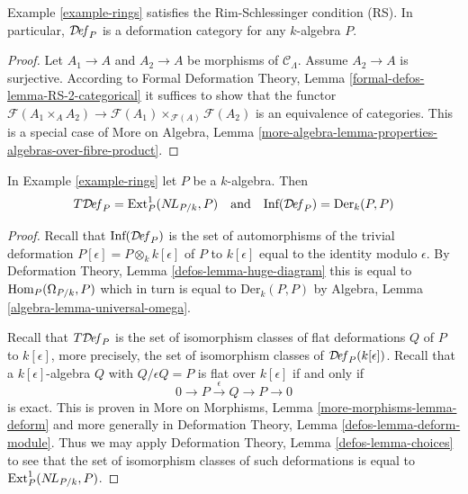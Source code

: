 \begin{lemma}
\label{lemma-rings-RS}
Example \ref{example-rings}
satisfies the Rim-Schlessinger condition (RS).
In particular, $\mathcal{D}\!\mathit{ef}_P$ is a deformation category
for any $k$-algebra $P$.
\end{lemma}

\begin{proof}
Let $A_1 \to A$ and $A_2 \to A$ be morphisms of $\mathcal{C}_\Lambda$.
Assume $A_2 \to A$ is surjective. According to
Formal Deformation Theory, Lemma
\ref{formal-defos-lemma-RS-2-categorical}
it suffices to show that the functor
$\mathcal{F}(A_1 \times_A A_2) \to
\mathcal{F}(A_1) \times_{\mathcal{F}(A)} \mathcal{F}(A_2)$
is an equivalence of categories.
This is a special case of More on Algebra, Lemma
\ref{more-algebra-lemma-properties-algebras-over-fibre-product}.
\end{proof}

\begin{lemma}
\label{lemma-rings-TI}
In Example \ref{example-rings} let $P$ be a $k$-algebra. Then
$$
T\mathcal{D}\!\mathit{ef}_P = \text{Ext}^1_P(\mathop{N\!L}\nolimits_{P/k}, P)
\quad\text{and}\quad
\text{Inf}(\mathcal{D}\!\mathit{ef}_P) = \text{Der}_k(P, P)
$$
\end{lemma}

\begin{proof}
Recall that $\text{Inf}(\mathcal{D}\!\mathit{ef}_P)$ is the set of
automorphisms of the trivial deformation
$P[\epsilon] = P \otimes_k k[\epsilon]$ of $P$ to $k[\epsilon]$
equal to the identity modulo $\epsilon$.
By Deformation Theory, Lemma \ref{defos-lemma-huge-diagram}
this is equal to $\mathop{\mathrm{Hom}}\nolimits_P(\Omega_{P/k}, P)$ which in turn is
equal to $\text{Der}_k(P, P)$ by
Algebra, Lemma \ref{algebra-lemma-universal-omega}.

\medskip\noindent
Recall that $T\mathcal{D}\!\mathit{ef}_P$ is the set of isomorphism classes
of flat deformations $Q$ of $P$ to $k[\epsilon]$, more precisely,
the set of isomorphism classes of $\mathcal{D}\!\mathit{ef}_P(k[\epsilon])$.
Recall that a $k[\epsilon]$-algebra $Q$ with $Q/\epsilon Q = P$
is flat over $k[\epsilon]$ if and only if
$$
0 \to P \xrightarrow{\epsilon} Q \to P \to 0
$$
is exact. This is proven in More on Morphisms, Lemma
\ref{more-morphisms-lemma-deform} and more generally in
Deformation Theory, Lemma \ref{defos-lemma-deform-module}.
Thus we may apply
Deformation Theory, Lemma \ref{defos-lemma-choices}
to see that the set of isomorphism classes of such
deformations is equal to $\text{Ext}^1_P(\mathop{N\!L}\nolimits_{P/k}, P)$.
\end{proof}

